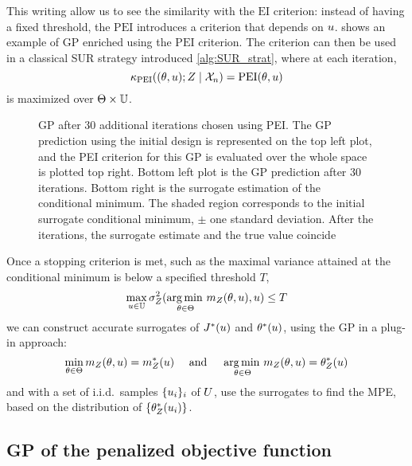 \documentclass[../../Main_ManuscritThese.tex]{subfiles}
\newcommand\imgpath{/home/victor/acadwriting/Manuscrit/Text/Chapter4/img/}
\begin{document}
This writing allow us to see the similarity with the $\mathrm{EI}$ criterion: instead of having a fixed threshold, the $\mathrm{PEI}$ introduces a criterion that depends on $u$.  shows an example of GP enriched using the $\mathrm{PEI}$ criterion.
The criterion can then be used in a classical SUR strategy introduced \cref{alg:SUR_strat}, where at each iteration,
\begin{equation}
  \label{eq:PEI_criterion_SUR}
  \kappa_{\mathrm{PEI}}((\theta, u) ; Z \mid \mathcal{X}_n) = \mathrm{PEI}(\theta, u)
\end{equation}
is maximized over $\Theta \times \mathbb{U}$.
\begin{figure}[ht]
  \centering
  
  \caption[Illustration of enrichment using the PEI criterion]{\label{fig:example_PEI} GP after 30 additional iterations chosen using PEI. The GP prediction using the initial design is represented on the top left plot, and the PEI criterion for this GP is evaluated over the whole space is plotted top right. Bottom left plot is the GP prediction after 30 iterations. Bottom right is the surrogate estimation of the conditional minimum. The shaded region corresponds to the initial surrogate conditional minimum, $\pm$ one standard deviation. After the iterations, the surrogate estimate and the true value coincide}
\end{figure}
Once a stopping criterion is met, such as the maximal variance attained at the conditional minimum is below a specified threshold $T$, 
\begin{equation}
  \max_{u\in\mathbb{U}} \sigma^2_Z(\operatorname*{arg\,min \,}_{\theta\in\Theta}m_Z(\theta,u), u) \leq T
\end{equation}
we can construct accurate surrogates of $J^*(u)$ and $\theta^*(u)$, using the GP in a plug-in approach:
\begin{equation}
  \min_{\theta\in\Theta} m_Z(\theta,u) = m^*_Z(u) \quad \text{ and } \quad \operatorname*{arg\,min \,}_{\theta\in\Theta} m_Z(\theta, u) = \theta_Z^*(u)
\end{equation}
and with a set of i.i.d.\ samples $\{u_i\}_i$ of $U$, use the surrogates to find the MPE, based on the distribution of $\{\theta_Z^*(u_i)\}$.


\subsection{GP of the penalized objective function}
\label{ssec:gp_delta_alpha}
\end{document}
